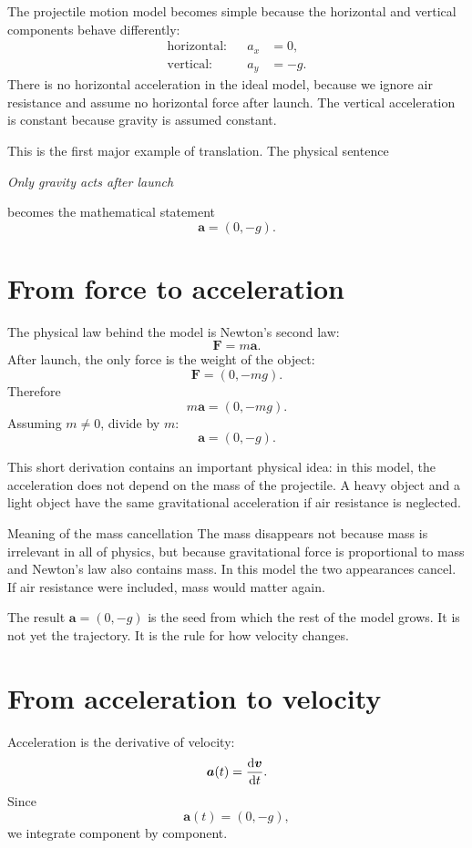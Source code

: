 \documentclass[11pt,a4paper]{article}
\newcommand{\vect}[1]{\boldsymbol{#1}}
\begin{document}
The projectile motion model becomes simple because the horizontal and vertical components behave differently:
\begin{align*}
\text{horizontal:} && a_x&=0, \\
\text{vertical:} && a_y&=-g.
\end{align*}
There is no horizontal acceleration in the ideal model, because we ignore air resistance and assume no horizontal force after launch. The vertical acceleration is constant because gravity is assumed constant.

This is the first major example of translation. The physical sentence

\emph{Only gravity acts after launch}

becomes the mathematical statement
\[
\vect a=(0,-g).
\]

\section{From force to acceleration}

The physical law behind the model is Newton's second law:
\[
\vect F=m\vect a.
\]
After launch, the only force is the weight of the object:
\[
\vect F=(0,-mg).
\]
Therefore
\[
 m\vect a=(0,-mg).
\]
Assuming $m\ne0$, divide by $m$:
\[
\vect a=(0,-g).
\]

This short derivation contains an important physical idea: in this model, the acceleration does not depend on the mass of the projectile. A heavy object and a light object have the same gravitational acceleration if air resistance is neglected.

\begin{principlebox}{Meaning of the mass cancellation}
The mass disappears not because mass is irrelevant in all of physics, but because gravitational force is proportional to mass and Newton's law also contains mass. In this model the two appearances cancel. If air resistance were included, mass would matter again.
\end{principlebox}

The result $\vect a=(0,-g)$ is the seed from which the rest of the model grows. It is not yet the trajectory. It is the rule for how velocity changes.

\section{From acceleration to velocity}

Acceleration is the derivative of velocity:
\[
\vect a(t)=\dv{\vect v}{t}.
\]
Since
\[
\vect a(t)=(0,-g),
\]
we integrate component by component.
\end{document}
